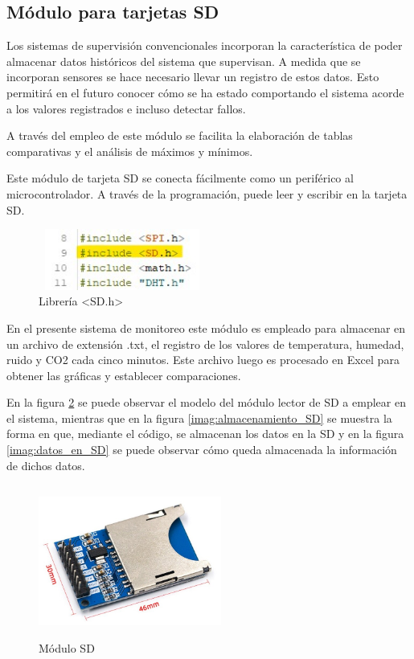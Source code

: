 \subsection{Módulo para tarjetas SD}

Los sistemas de supervisión convencionales incorporan la característica de poder
almacenar datos históricos del sistema que supervisan. A medida que se incorporan sensores se hace necesario llevar un registro de estos datos. Esto permitirá en el futuro conocer cómo se ha
estado comportando el sistema acorde a los valores registrados e incluso detectar fallos. 

A través del empleo de este módulo se facilita la elaboración de tablas comparativas y el análisis de máximos y mínimos.

Este módulo de tarjeta SD se conecta fácilmente como un periférico al microcontrolador. A través de la programación, puede leer y escribir en la tarjeta SD.

\begin{figure}[H]
    \centering
    \includegraphics[width=5.5cm, height=2cm]{imagenes/libreria SD.jpg}
    \caption{Librería <SD.h>}
    \label{imag:libreria_SD}
\end{figure}

En el presente sistema de monitoreo este módulo es empleado para almacenar en un archivo de extensión .txt, el registro de los valores de temperatura, humedad, ruido y CO2 cada cinco minutos. Este archivo luego es procesado en Excel para obtener las 
gráficas y establecer comparaciones.

En la figura \ref{imag:modulo_SD} se puede observar el modelo del módulo lector de SD a emplear en el sistema, mientras que en la figura \ref{imag:almacenamiento_SD} se muestra la forma en que, mediante el código, se almacenan los datos en la SD y en la figura \ref{imag:datos_en_SD} se puede observar cómo queda almacenada la información de dichos datos. 

\begin{figure}[H]
    \centering
    \includegraphics[width=6cm, height=5cm]{imagenes/modulo SD.jpg}
    \caption{Módulo SD}
    \label{imag:modulo_SD}
\end{figure}

